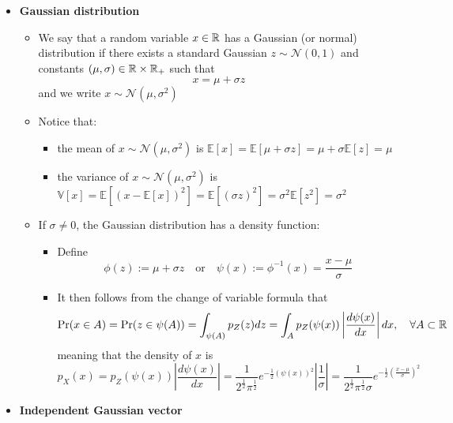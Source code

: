\documentclass[12pt,a4paper]{article}
\begin{document}
\begin{itemize}
\begin{itemize}
  \end{itemize}

\item \textbf{Gaussian distribution}

  \begin{itemize}

  \item We say that a random variable $x\in \mathbb{R}$ has a Gaussian (or normal) distribution if
    there exists
    a standard Gaussian $z\sim \mathcal{N}(0,1)$
    and constants $(\mu,\sigma) \in \mathbb{R}\times \mathbb{R}_{+}$
    such that
    \begin{equation}\nonumber%
      x = \mu + \sigma z
    \end{equation}
  and we write $x\sim \mathcal{N}(\mu, \sigma^{2})$

  \item Notice that:
    \begin{itemize}
    \item the mean of $x\sim \mathcal{N}(\mu, \sigma^{2})$ is
      $\mathbb{E}\left[x\right]=\mathbb{E}\left[ \mu + \sigma z \right]=\mu+\sigma\mathbb{E}[z]=\mu$
    \item the variance of $x\sim \mathcal{N}(\mu, \sigma^{2})$ is
      $\mathbb{V}\left[x\right] = \mathbb{E}\left[ (x-\mathbb{E}[x])^{2} \right]=\mathbb{E}\left[ (\sigma z)^{2} \right] =\sigma^{2}\mathbb{E}\left[ z^{2} \right] = \sigma^{2}$
    \end{itemize}

  \item If $\sigma\neq 0$,
    the Gaussian distribution has a density function:
    \begin{itemize}
      \item Define
        \begin{equation}\nonumber%
          \phi(z):=\mu + \sigma z
          \quad\text{or} \quad
          \psi(x):=\phi^{-1}(x)= \frac{x-\mu}{\sigma}
        \end{equation}
      \item It then follows from the change of variable formula that
        \begin{equation}\nonumber%
          \text{Pr}(x\in A)
          =
          \text{Pr}(z \in \psi(A))
          =
          \int_{\psi(A)}p_{Z}(z)dz
          =
          \int_{A}p_{Z}(\psi(x)) \left| \frac{d\psi(x)}{dx} \right| dx,
          \quad \forall A\subset \R
        \end{equation}
        meaning that the density of $x$ is
        \begin{equation}\nonumber%
          p_{X}(x)
          =
          p_{Z}(\psi(x)) \left| \frac{d\psi(x)}{dx} \right|
          =
          \frac{1}{2^{\frac{1}{2}}\pi^{\frac{1}{2}}}e^{- \frac{1}{2}(\psi(x))^{2}}
          \left| \frac{1}{\sigma}\right|
          =
          \frac{1}{2^{\frac{1}{2}}\pi^{\frac{1}{2}}\sigma}e^{- \frac{1}{2}\left(\frac{x-\mu}{\sigma}\right)^{2}}
        \end{equation}
      \end{itemize}
    \end{itemize}
\item \textbf{Independent Gaussian vector}
  

\end{itemize}
\end{document}
